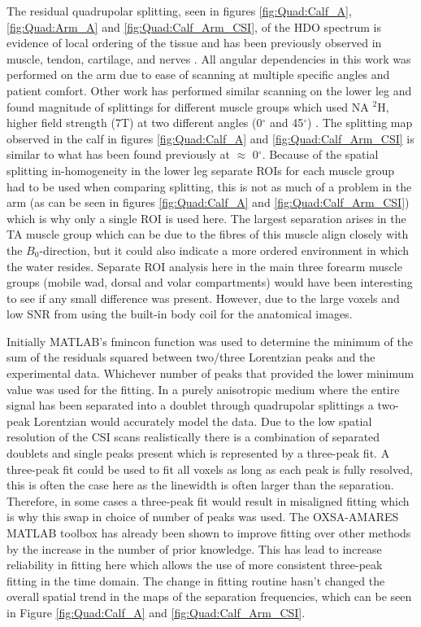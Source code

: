 The residual quadrupolar splitting, seen in figures \ref{fig:Quad:Calf_A}, \ref{fig:Quad:Arm_A} and \ref{fig:Quad:Calf_Arm_CSI}, of the \ac{HDO} spectrum is evidence of local ordering of the tissue and has been previously observed in muscle, tendon, cartilage, and nerves \cite{Gursan2022ResidualMuscle,Sharf1995DetectionNMR-Spectroscopy,Perea20072HDisc,Eliav2016MultipleMRS}. All angular dependencies in this work was performed on the arm due to ease of scanning at multiple specific angles and patient comfort. Other work has performed similar scanning on the lower leg and found magnitude of splittings for different muscle groups which used \ac{NA} $^2$H, higher field strength (7T) at two different angles (0$^\circ$ and 45$^\circ$) \cite{Gursan2022ResidualMuscle}. The splitting map observed in the calf in figures \ref{fig:Quad:Calf_A} and \ref{fig:Quad:Calf_Arm_CSI} is similar to what has been found previously at $\approx$ 0$^\circ$. Because of the spatial splitting in-homogeneity in the lower leg separate \ac{ROI}s for each muscle group had to be used when comparing splitting, this is not as much of a problem in the arm (as can be seen in figures \ref{fig:Quad:Calf_A} and \ref{fig:Quad:Calf_Arm_CSI}) which is why only a single  ROI is used here. The largest separation arises in the TA muscle group which can be due to the fibres of this muscle align closely \cite{Gursan2022ResidualMuscle} with the $B_0$-direction, but it could also indicate a more ordered environment in which the water resides. Separate \ac{ROI} analysis here in the main three forearm muscle groups (mobile wad, dorsal and volar compartments) would have been interesting to see if any small difference was present. However, due to the large voxels and low \ac{SNR} from using the built-in body coil for the anatomical images. 

Initially MATLAB's fmincon function was used to determine the minimum of the sum of the residuals squared between two/three Lorentzian peaks and the experimental data. Whichever number of peaks that provided the lower minimum value was used for the fitting. In a purely anisotropic medium where the entire signal has been separated into a doublet through quadrupolar splittings a two-peak Lorentzian would accurately model the data. Due to the low spatial resolution of the \ac{CSI} scans realistically there is a combination of separated doublets and single peaks present which is represented by a three-peak fit. A three-peak fit could be used to fit all voxels as long as each peak is fully resolved, this is often the case here as the linewidth is often larger than the separation. Therefore, in some cases a three-peak fit would result in misaligned fitting which is why this swap in choice of number of peaks was used. The OXSA-AMARES MATLAB toolbox has already been shown to improve fitting over other methods by the increase in the number of prior knowledge. This has lead to increase reliability in fitting here which allows the use of more consistent three-peak fitting in the time domain. The change in fitting routine hasn't changed the overall spatial trend in the maps of the separation frequencies, which can be seen in Figure \ref{fig:Quad:Calf_A} and \ref{fig:Quad:Calf_Arm_CSI}.


